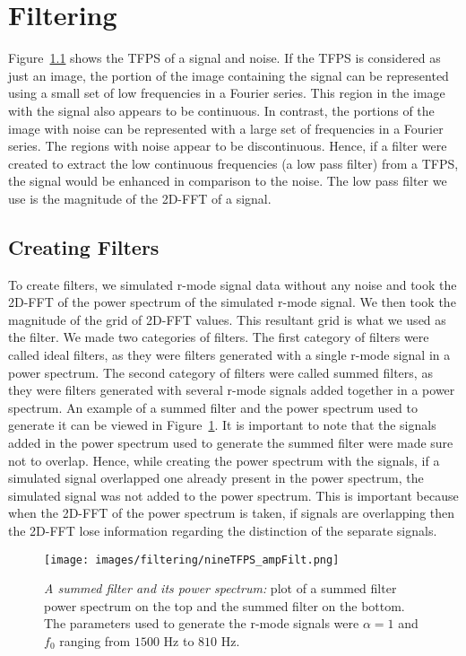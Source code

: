 \documentclass[%
reprint,
amsmath,amssymb,
aps,
]{revtex4-1}
\begin{document}
	
	\section{Filtering}
	Figure~\ref{} shows the TFPS of a signal and noise. If the TFPS is considered as just an image, the portion of the image containing the signal can be represented using a small set of low frequencies in a Fourier series. This region in the image with the signal also appears to be continuous. In contrast, the portions of the image with noise can be represented with a large set of frequencies in a Fourier series. The regions with noise appear to be discontinuous. Hence, if a filter were created to extract the low continuous frequencies (a low pass filter) from a TFPS, the signal would be enhanced in comparison to the noise. The low pass filter we use is the magnitude of the 2D-FFT of a signal. 
	
	\subsection{Creating Filters}
	To create filters, we simulated r-mode signal data without any noise and took the 2D-FFT of the power spectrum of the simulated r-mode signal. We then took the magnitude of the grid of 2D-FFT values. This resultant grid is what we used as the filter. We made two categories of filters. The first category of filters were called ideal filters, as they were filters generated with a single r-mode signal in a power spectrum. The second category of filters were called summed filters, as they were filters generated with several r-mode signals added together in a power spectrum. An example of a summed filter and the power spectrum used to generate it can be viewed in Figure~\ref{fig:summedFilter}. It is important to note that the signals added in the power spectrum used to generate the summed filter were made sure not to overlap. Hence, while creating the power spectrum with the signals, if a simulated signal overlapped one already present in the power spectrum, the simulated signal was not added to the power spectrum. This is important because when the 2D-FFT of the power spectrum is taken, if signals are overlapping then the 2D-FFT lose information regarding the distinction of the separate signals. 
	
	\begin{figure}[h]
		\centering
		\texttt{[image: images/filtering/nineTFPS\_ampFilt.png]}
		\caption{\textit{A summed filter and its power spectrum:} plot of a summed filter power spectrum on the top and the summed filter on the bottom. The parameters used to generate the r-mode signals were $\alpha = 1$ and $f_0$ ranging from $1500$ Hz to $810$ Hz.}
		\label{fig:summedFilter}
	\end{figure}
	
\end{document}
